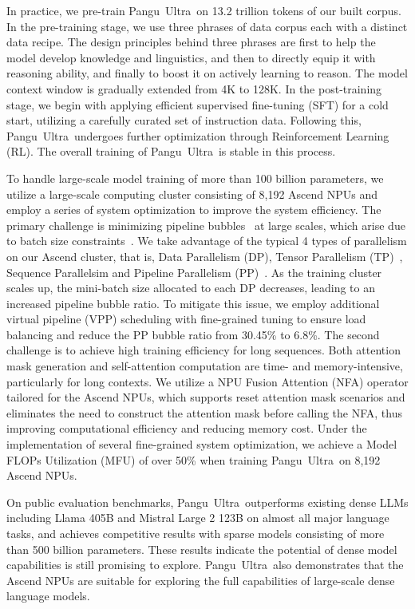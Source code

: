 \documentclass{article}
\newcommand{\pangu}{Pangu}
\newcommand{\modelname}{\pangu~Ultra}
\begin{document}
In practice, we pre-train \modelname~on 13.2 trillion tokens of our built corpus. In the pre-training stage, we use three phrases of data corpus each with a distinct data recipe. The design principles behind three phrases are first to help the model develop knowledge and linguistics, and then to directly equip it with reasoning ability, and finally to boost it on actively learning to reason. The model context window is gradually extended from 4K to 128K. In the post-training stage, we begin with applying efficient supervised fine-tuning (SFT) for a cold start, utilizing a carefully curated set of instruction data. Following this, \modelname~undergoes further optimization through Reinforcement Learning (RL). The overall training of \modelname~is stable in this process.

To handle large-scale model training of more than 100 billion parameters, we utilize a large-scale computing cluster consisting of 8,192 Ascend NPUs and employ a series of system optimization to improve the system efficiency.
The primary challenge is minimizing pipeline bubbles~\cite{huang2019gpipe} at large scales, which arise due to batch size constraints~\cite{megascale}. 
We take advantage of the typical 4 types of parallelism on our Ascend cluster, that is, Data Parallelism (DP), Tensor Parallelism (TP)~\cite{megatron-lm}, Sequence Parallelsim \cite{megatron-sp} and Pipeline Parallelism (PP)~\cite{gpipe,pipedream}. 
As the training cluster scales up, the mini-batch size allocated to each DP decreases, leading to an increased pipeline bubble ratio. To mitigate this issue, we employ additional virtual pipeline (VPP) scheduling \cite{interleaved-pp} with fine-grained tuning to ensure load balancing and reduce the PP bubble ratio from 30.45\% to 6.8\%.
The second challenge is to achieve high training efficiency for long sequences. 
Both attention mask generation and self-attention computation are time- and memory-intensive, particularly for long contexts.
We utilize a NPU Fusion Attention (NFA) operator \cite{fa-github, flash_attention, flash_attention2} tailored for the Ascend NPUs, which supports reset attention mask scenarios and eliminates the need to construct the attention mask before calling the NFA, thus improving computational efficiency and reducing memory cost.
Under the implementation of several fine-grained system optimization, we achieve a Model FLOPs Utilization (MFU) \cite{palm} of over 50\% when training \modelname~on 8,192 Ascend NPUs.

On public evaluation benchmarks, \modelname~outperforms existing dense LLMs including Llama 405B and Mistral Large 2 123B on almost all major language tasks, and achieves competitive results with sparse models consisting of more than 500 billion parameters. These results indicate the potential of dense model capabilities is still promising to explore. \modelname~also demonstrates that the Ascend NPUs are suitable for exploring the full capabilities of large-scale dense language models. 
\end{document}
